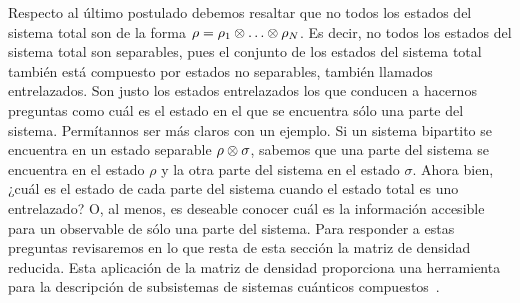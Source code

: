 Respecto al último postulado debemos resaltar que no todos 
los estados del sistema total son de la forma $\rho=\rho_1
\otimes \ldots \otimes \rho_N$. Es decir, no todos los estados del sistema 
total son separables, pues el conjunto de los estados 
del sistema total también está compuesto por estados 
no separables, también llamados entrelazados.
Son justo los estados entrelazados los que conducen a hacernos preguntas
como cuál es el estado en el que se encuentra sólo una parte del sistema. 
Permítannos ser más claros con un ejemplo. Si un sistema bipartito 
se encuentra en un estado separable $\rho\otimes \sigma$, sabemos 
que una parte del sistema se encuentra en el estado $\rho$ y la otra 
parte del sistema en el estado $\sigma$. Ahora bien, ¿cuál es el estado
de cada parte del sistema cuando el estado total es uno entrelazado? O,
al menos, es deseable conocer cuál es la información accesible 
para un observable de sólo una parte del sistema. Para responder a 
estas preguntas revisaremos en lo que resta de esta sección
la matriz de densidad reducida. Esta aplicación de la matriz de densidad 
proporciona una herramienta para la descripción de subsistemas 
de sistemas cuánticos compuestos~\cite{nielsen_chuang_2011}.

